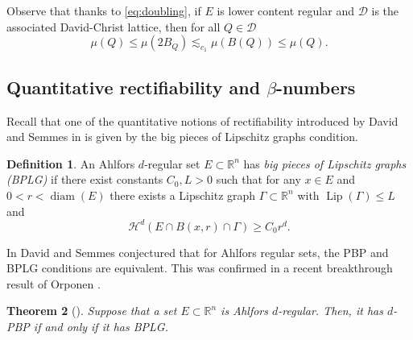\documentclass[11pt,reqno]{amsart}
\DeclareMathOperator{\diam}{diam}
\newtheorem{theorem}{Theorem}[section]
\theoremstyle{definition}
\newtheorem{definition}[theorem]{Definition}
\theoremstyle{remark}
\numberwithin{equation}{section}
\newcommand{\R}{\mathbb{R}}
\newcommand{\DD}{\mathcal{D}}
\DeclareMathOperator{\lip}{Lip}
\theoremstyle{theorem}
\theoremstyle{definition}
\theoremstyle{remark}
\numberwithin{equation}{section}
\begin{document}
	Observe that thanks to \eqref{eq:doubling}, if $E$ is lower content regular and $\DD$ is the associated David-Christ lattice, then for all $Q\in\DD$
	\begin{equation}\label{eq:doubling cubes}
	\mu(Q)\le \mu(2B_Q)\lesssim_{c_1}\mu(B(Q))\le \mu(Q).
	\end{equation}
	
		\subsection{Quantitative rectifiability and \texorpdfstring{$\beta$}{beta}-numbers}
  	Recall that one of the quantitative notions of rectifiability introduced by David and Semmes in \cite{david1991singular} is given by the big pieces of Lipschitz graphs condition.
	\begin{definition}\label{def:BPLG}
		An Ahlfors $d$-regular set $E\subset\R^n$ has \emph{big pieces of Lipschitz graphs (BPLG)} if there exist constants $C_0, L> 0$ such that for any $x\in E$ and $0<r<\diam(E)$ there exists a Lipschitz graph $\Gamma\subset\R^n$ with $\lip(\Gamma)\le L$ and
		\begin{equation}\label{eq:BPLG}
		\mathcal{H}^d(E\cap B(x,r)\cap\Gamma)\ge C_0r^d.
		\end{equation}
	\end{definition}

 
 In \cite{david1993quantitative} David and Semmes conjectured that for Ahlfors regular sets, the PBP and BPLG conditions are equivalent. This was confirmed in a recent breakthrough result of Orponen \cite{orponen2020plenty}.
	\begin{theorem}[\cite{orponen2020plenty}]\label{thm:orponen}
		Suppose that a set $E\subset\R^n$ is Ahlfors $d$-regular. Then, it has $d$-PBP if and only if it has BPLG.
	\end{theorem}
%
%
%
%
%
%
%
\end{document}
